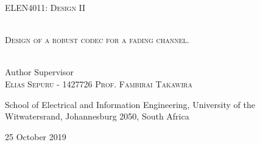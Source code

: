 


\newcommand{\HRule}{\centering{\rule{.9\linewidth}{.6pt}}} %

\newcommand{\decoRule}{\rule{.8\textwidth}{.4pt}} %


\begin{titlepage}
   \begin{center}
   	   
   	    \vspace*{\fill}
      	\textsc{
      		\LARGE
      		ELEN4011: Design II
      	}
      
      	\HRule \\[0.4cm] %
      
      	\textsc{
      		\LARGE
      	Design of a robust codec for a fading channel.}
      
      	\HRule \\[1.5cm] %
      	
      	
      	\hspace{0.60cm} Author \hspace{4.1cm} Supervisor\\
      	\hspace{0.45cm}\textsc{Elias Sepuru - 1427726} \hspace{1cm}\textsc{Prof. Fambirai Takawira}
      	
      	{
      		\vspace{1cm}
      		School of Electrical and Information Engineering,
      		University of the Witwatersrand, Johannesburg 2050, South Africa
      		\\
        }
    	
    	\vspace*{1cm}	
    	{25 October 2019}
    	
      	\vspace*{\fill}
    
 
   \end{center}
\end{titlepage}